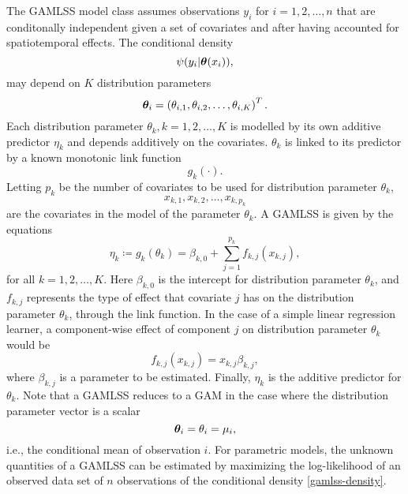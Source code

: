 The GAMLSS model class assumes observations $y_i$ for $i=1,2,\ldots,n$ that are conditonally independent given a set of covariates and after having accounted for spatiotemporal effects.
The conditional density
\begin{equation}\label{gamlss-density}
    \psi(y_i|\boldsymbol{\theta}(x_i)),
\end{equation}
may depend on $K$ distribution parameters
\begin{equation*}
    \boldsymbol{\theta}_i=\left(\theta_{i,1},\theta_{i,2},\ldots,\theta_{i,K}\right)^T.
\end{equation*}
Each distribution parameter $\theta_k,k=1,2,\ldots,K$ is modelled by its own additive predictor $\eta_{k}$ and depends additively
on the covariates.
$\theta_k$ is linked to its predictor by a known monotonic link function
\begin{equation*}
    g_k(\cdot).
\end{equation*}
Letting $p_k$ be the number of covariates to be used for distribution parameter $\theta_k$,
\begin{equation*}
    x_{k,1},x_{k,2},\ldots,x_{k,p_k}
\end{equation*}
are the covariates in the model of the parameter $\theta_k$.
A GAMLSS is given by the equations
\begin{equation*}
    \eta_k\coloneqq g_k(\theta_k)=\beta_{k,0}+\sum_{j=1}^{p_k}f_{k,j}(x_{k,j}),
\end{equation*}
for all $k=1,2,\ldots,K$. Here $\beta_{k,0}$ is the intercept for distribution parameter $\theta_k$, and $f_{k,j}$ represents the type of effect that covariate $j$ has on the distribution parameter $\theta_k$, through the link function.
In the case of a simple linear regression learner, a component-wise effect of component $j$ on distribution parameter $\theta_k$ would be
\begin{equation*}
    f_{k,j}(x_{k,j})=x_{k,j}\beta_{k,j},
\end{equation*}
where $\beta_{k,j}$ is a parameter to be estimated.
Finally, $\eta_{k}$ is the additive predictor for $\theta_k$.
Note that a GAMLSS reduces to a GAM \citep{gam-book} in the case where the distribution parameter vector is a scalar
\begin{equation*}
    \boldsymbol{\theta}_i=\theta_i=\mu_i,
\end{equation*}
i.e., the conditional mean of observation $i$.
For parametric models, the unknown quantities of a GAMLSS can be estimated by maximizing the log-likelihood of an observed data set of $n$ observations of the conditional density \eqref{gamlss-density}.
